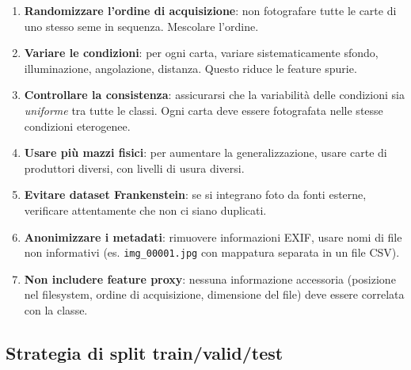 \documentclass[a4paper,12pt]{article}
\begin{document}
\begin{enumerate}[label=\textbf{R\arabic*.}]
    \item \textbf{Randomizzare l'ordine di acquisizione}: non fotografare tutte le carte di uno stesso seme in sequenza. Mescolare l'ordine.
    
    \item \textbf{Variare le condizioni}: per ogni carta, variare sistematicamente sfondo, illuminazione, angolazione, distanza. Questo riduce le feature spurie.
    
    \item \textbf{Controllare la consistenza}: assicurarsi che la variabilità delle condizioni sia \emph{uniforme} tra tutte le classi. Ogni carta deve essere fotografata nelle stesse condizioni eterogenee.
    
    \item \textbf{Usare più mazzi fisici}: per aumentare la generalizzazione, usare carte di produttori diversi, con livelli di usura diversi.
    
    \item \textbf{Evitare dataset Frankenstein}: se si integrano foto da fonti esterne, verificare attentamente che non ci siano duplicati.
    
    \item \textbf{Anonimizzare i metadati}: rimuovere informazioni EXIF, usare nomi di file non informativi (es. \texttt{img\_00001.jpg} con mappatura separata in un file CSV).
    
    \item \textbf{Non includere feature proxy}: nessuna informazione accessoria (posizione nel filesystem, ordine di acquisizione, dimensione del file) deve essere correlata con la classe.
\end{enumerate}

\subsection{Strategia di split train/valid/test}
\end{document}
